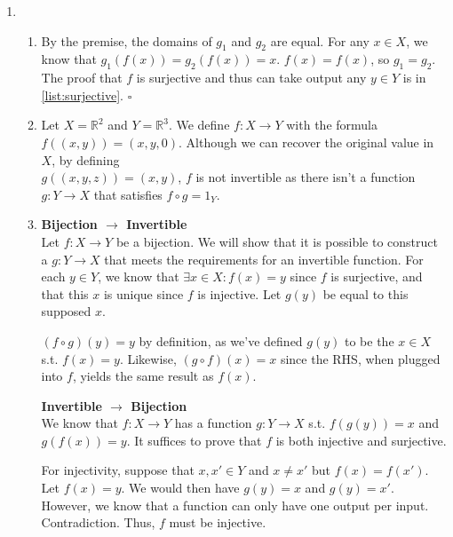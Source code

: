 \documentclass[12pt]{article}
\begin{document}
\begin{enumerate}
      \item \begin{enumerate}
                  \item By the premise, the domains of $g_1$ and $g_2$ are equal.
                        For any $x \in X$, we know that $g_1(f(x))=g_2(f(x))=x$.
                        $f(x)=f(x)$, so $g_1=g_2$.
                        The proof that $f$ is surjective and thus can take output any
                        $y \in Y$ is in \ref{list:surjective}. $\square$
                  \item Let $X=\mathbb{R}^2$ and $Y=\mathbb{R}^3$.
                        We define $f: X \rightarrow Y$ with the formula $f((x,y))=(x,y,0)$.
                        Although we can recover the original value in $X$, by defining \\
                        $g((x,y,z))=(x,y)$, $f$ is not invertible as there isn't a function
                        $g: Y \rightarrow X$ that satisfies $f \circ g = 1_Y$.
                  \item \textbf{Bijection $\rightarrow$ Invertible} \\
                        Let $f: X \rightarrow Y$ be a bijection.
                        We will show that it is possible to construct a $g: Y \rightarrow X$ that meets the requirements for an invertible function.
                        For each $y \in Y$, we know that $\exists x \in X: f(x)=y$ since $f$ is surjective, and that this $x$ is unique since $f$ is injective.
                        Let $g(y)$ be equal to this supposed $x$.

                        $(f \circ g)(y)=y$ by definition, as we've defined $g(y)$ to be the $x \in X$ s.t. $f(x)=y$.
                        Likewise, $(g \circ f)(x)=x$ since the RHS, when plugged into $f$, yields the same result as $f(x)$.

                        \textbf{Invertible $\rightarrow$ Bijection} \\
                        We know that $f: X \rightarrow Y$ has a function $g: Y \rightarrow X$ s.t. $f(g(y))=x$ and $g(f(x))=y$.
                        It suffices to prove that $f$ is both injective and surjective.

                        For injectivity, suppose that $x, x' \in Y$ and $x \ne x'$ but $f(x)=f(x')$.
                        Let $f(x)=y$.
                        We would then have $g(y)=x$ and $g(y)=x'$.
                        However, we know that a function can only have one output per input.
                        Contradiction.
                        Thus, $f$ must be injective.


\end{enumerate}
\end{enumerate}
\end{document}
